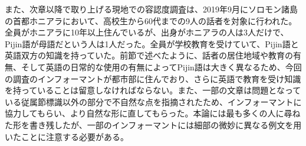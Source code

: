 また、次章以降で取り上げる現地での容認度調査は、2019年9月にソロモン諸島の首都ホニアラにおいて、高校生から60代までの9人の話者を対象に行われた。全員がホニアラに10年以上住んでいるが、出身がホニアラの人は3人だけで、Pijin語が母語だという人は1人だった。全員が学校教育を受けていて、Pijin語と英語双方の知識を持っていた。前節で述べたように、話者の居住地域や教育の有無、そして英語の日常的な使用の有無によってPijin語は大きく異なるため、今回の調査のインフォーマントが都市部に住んでおり、さらに英語で教育を受け知識を持っていることは留意しなければならない。また、一部の文章は問題となっている従属節標識以外の部分で不自然な点を指摘されたため、インフォーマントに協力してもらい、より自然な形に直してもらった。本論には最も多くの人に尋ねた形を書き残したが、一部のインフォーマントには細部の微妙に異なる例文を用いたことに注意する必要がある。
